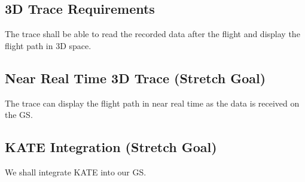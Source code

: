 \documentclass[onecolumn, draftclsnofoot,10pt, compsoc]{IEEEtran}
\begin{document}
\subsection{3D Trace Requirements}
The trace shall be able to read the recorded data after the flight
and display the flight path in 3D space.
\subsection{Near Real Time 3D Trace (Stretch Goal)}
The trace can display the flight path in near
real time as the data is received on the GS.
\subsection{KATE Integration (Stretch Goal)}
We shall integrate KATE into our GS.


\end{document}
